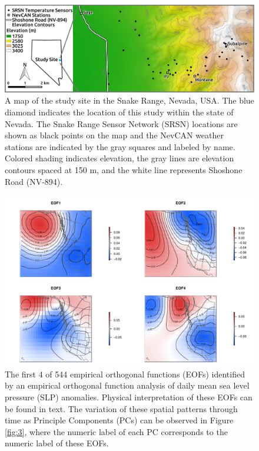 \documentclass{ametsoc}
\begin{document}
\begin{figure}[ht]

 \centerline{\includegraphics[width=39pc]{figure01_study-site.pdf}}

  \caption{A map of the study site in the Snake Range, Nevada, USA.  The blue diamond
  indicates the location of this study within the state of Nevada.  The
  Snake Range Sensor Network (SRSN) locations are shown as black points on the map
  and the NevCAN weather stations are indicated by the gray squares and
  labeled by name.  Colored shading indicates elevation, 
  the gray lines are elevation contours spaced at 150 m, and the white line represents
  Shoshone Road (NV-894).}\label{fig:1}

\end{figure}


\begin{figure}[ht]

 \centerline{\includegraphics[width=39pc]{figure02_EOFs.pdf}}

  \caption{The first 4 of 544 empirical orthogonal functions (EOFs) identified by an empirical orthogonal function
  analysis of daily mean sea level pressure (SLP) anomalies.  Physical interpretation of these
  EOFs can be found in text.  The variation of these spatial patterns through time as Principle 
  Components (PCs) can be observed in Figure \ref{fig:3}, where the numeric label of each PC corresponds
  to the numeric label of these EOFs.}\label{fig:2}

\end{figure}
\end{document}
